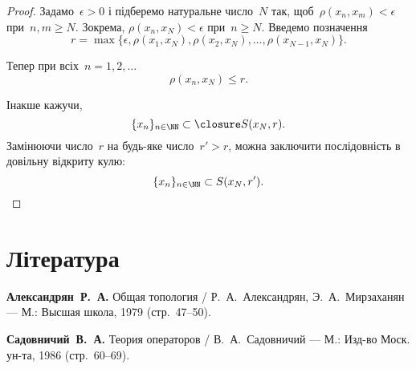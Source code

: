 \begin{proof}
Задамо~$\epsilon > 0$ і підберемо натуральне число~$N$
так, щоб~$\rho(x_n, x_m) < \epsilon$ при~$n, m \ge N$.
Зокрема, $\rho(x_n, x_N) < \epsilon$ при~$n \ge N$.
Введемо позначення
\begin{equation*}
    r = \max \{ \epsilon, \rho(x_1, x_N), \rho(x_2, x_N), \dots, \rho(x_{N - 1}, x_N) \}.
\end{equation*}

Тепер при всіх~$n = 1, 2, \dots$
\begin{equation*}
    \rho(x_n, x_N) \le r.
\end{equation*}

Інакше кажучи,
\begin{equation*}
    \{x_n\}_{n \in \NN} \subset \closure S(x_N, r).
\end{equation*}
Замінюючи число~$r$ на будь-яке число~$r' > r$, можна
заключити послідовність в довільну відкриту кулю:
\begin{equation*}
    \{x_n\}_{n \in \NN} \subset S(x_N, r'). \qedhere
\end{equation*}
\end{proof}

\section{Література}

\begin{enumerate}[label={[\arabic*]}]
\item \textbf{Александрян~Р.~А.}
Общая топология /
Р.~А.~Александрян, Э.~А.~Мирзаханян ---
М.: Высшая школа, 1979 (стр.~47--50).
\item \textbf{Садовничий~В.~А.}
Теория операторов /
В.~А.~Садовничий ---
М.: Изд-во Моск. ун-та, 1986 (стр.~60--69).
\end{enumerate}
